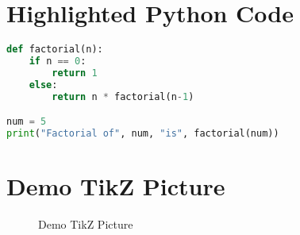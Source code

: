 \documentclass{article}
\begin{document}
\section{Highlighted Python Code}
\lipsum[7]
\begin{lstlisting}[language=Python, caption=Python Code, label=lst:python-code]
def factorial(n):
    if n == 0:
        return 1
    else:
        return n * factorial(n-1)

num = 5
print("Factorial of", num, "is", factorial(num))
\end{lstlisting}


\section{Demo TikZ Picture}
\lipsum[8]
\begin{figure}[h]
  \centering
  \caption{Demo TikZ Picture}
  \label{fig:demo-tikz}
\end{figure}
\lipsum[9-40]
\end{document}

